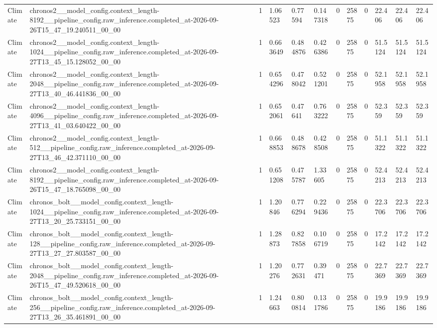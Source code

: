 \begin{tabular}{llllllllllll}
Climate & chronos2\_\_model\_config.context\_length-8192\_\_pipeline\_config.raw\_inference.completed\_at-2026-09-26T15\_47\_19.240511\_00\_00 & 1 & 1.06523 & 0.77594 & 0.147318 & 0 & 25875 & 0 & 22.406 & 22.406 & 22.406 \\
Climate & chronos2\_\_model\_config.context\_length-1024\_\_pipeline\_config.raw\_inference.completed\_at-2026-09-27T13\_45\_15.128052\_00\_00 & 1 & 0.663649 & 0.484876 & 0.426386 & 0 & 25875 & 0 & 51.5124 & 51.5124 & 51.5124 \\
Climate & chronos2\_\_model\_config.context\_length-2048\_\_pipeline\_config.raw\_inference.completed\_at-2026-09-27T13\_40\_46.441836\_00\_00 & 1 & 0.654296 & 0.478042 & 0.521201 & 0 & 25875 & 0 & 52.1958 & 52.1958 & 52.1958 \\
Climate & chronos2\_\_model\_config.context\_length-4096\_\_pipeline\_config.raw\_inference.completed\_at-2026-09-27T13\_41\_03.640422\_00\_00 & 1 & 0.652061 & 0.47641 & 0.763222 & 0 & 25875 & 0 & 52.359 & 52.359 & 52.359 \\
Climate & chronos2\_\_model\_config.context\_length-512\_\_pipeline\_config.raw\_inference.completed\_at-2026-09-27T13\_46\_42.371110\_00\_00 & 1 & 0.668853 & 0.488678 & 0.428508 & 0 & 25875 & 0 & 51.1322 & 51.1322 & 51.1322 \\
Climate & chronos2\_\_model\_config.context\_length-8192\_\_pipeline\_config.raw\_inference.completed\_at-2026-09-26T15\_47\_18.765098\_00\_00 & 1 & 0.651208 & 0.475787 & 1.33605 & 0 & 25875 & 0 & 52.4213 & 52.4213 & 52.4213 \\
Climate & chronos\_bolt\_\_model\_config.context\_length-1024\_\_pipeline\_config.raw\_inference.completed\_at-2026-09-27T13\_20\_25.733151\_00\_00 & 1 & 1.20846 & 0.776294 & 0.229436 & 0 & 25875 & 0 & 22.3706 & 22.3706 & 22.3706 \\
Climate & chronos\_bolt\_\_model\_config.context\_length-128\_\_pipeline\_config.raw\_inference.completed\_at-2026-09-27T13\_27\_27.803587\_00\_00 & 1 & 1.28873 & 0.827858 & 0.106719 & 0 & 25875 & 0 & 17.2142 & 17.2142 & 17.2142 \\
Climate & chronos\_bolt\_\_model\_config.context\_length-2048\_\_pipeline\_config.raw\_inference.completed\_at-2026-09-26T15\_47\_49.520618\_00\_00 & 1 & 1.20276 & 0.772631 & 0.39471 & 0 & 25875 & 0 & 22.7369 & 22.7369 & 22.7369 \\
Climate & chronos\_bolt\_\_model\_config.context\_length-256\_\_pipeline\_config.raw\_inference.completed\_at-2026-09-27T13\_26\_35.461891\_00\_00 & 1 & 1.24663 & 0.800814 & 0.131786 & 0 & 25875 & 0 & 19.9186 & 19.9186 & 19.9186 \\

\end{tabular}
